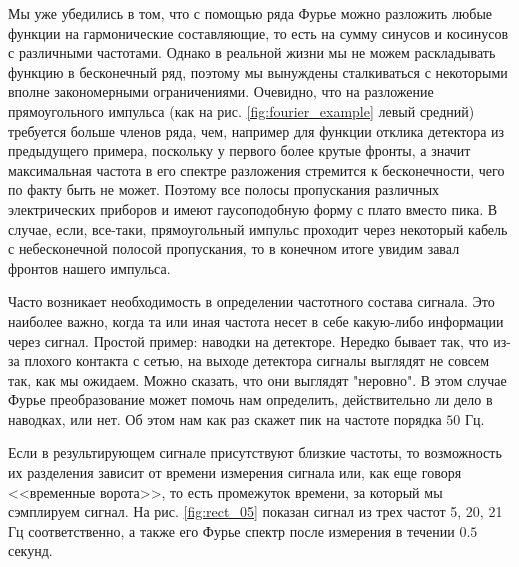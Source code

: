 Мы уже убедились в том, что с помощью ряда Фурье можно разложить любые функции на гармонические составляющие, то есть на сумму синусов и косинусов с различными частотами. Однако в реальной жизни мы не можем раскладывать функцию в бесконечный ряд, поэтому мы вынуждены сталкиваться с некоторыми вполне закономерными ограничениями. Очевидно, что на разложение прямоугольного импульса (как на рис. \ref{fig:fourier_example} левый средний) требуется больше членов ряда, чем, например для функции отклика детектора из предыдущего примера, поскольку у первого более крутые фронты, а значит максимальная частота в его спектре разложения стремится к бесконечности, чего по факту быть не может. Поэтому все полосы пропускания различных электрических приборов и имеют гаусоподобную форму с плато вместо пика. В случае, если, все-таки, прямоугольный импульс проходит через некоторый кабель с небесконечной полосой пропускания, то в конечном итоге увидим завал фронтов нашего импульса.

Часто возникает необходимость в определении частотного состава сигнала. Это наиболее важно, когда та или иная частота несет в себе какую-либо информации через сигнал. Простой пример: наводки на детекторе. Нередко бывает так, что из-за плохого контакта с сетью, на выходе детектора сигналы выглядят не совсем так, как мы ожидаем. Можно сказать, что они выглядят "неровно". В этом случае Фурье преобразование может помочь нам определить, действительно ли дело в наводках, или нет. Об этом нам как раз скажет пик на частоте порядка $50$ Гц. 

Если в результирующем сигнале присутствуют близкие частоты, то возможность их разделения зависит от времени измерения сигнала или, как еще говоря <<временные ворота>>, то есть промежуток времени, за который мы сэмплируем сигнал. На рис. \ref{fig:rect_05} показан сигнал из трех частот 5, 20, 21 Гц соответственно, а также его Фурье спектр после измерения в течении $0.5$ секунд. 

